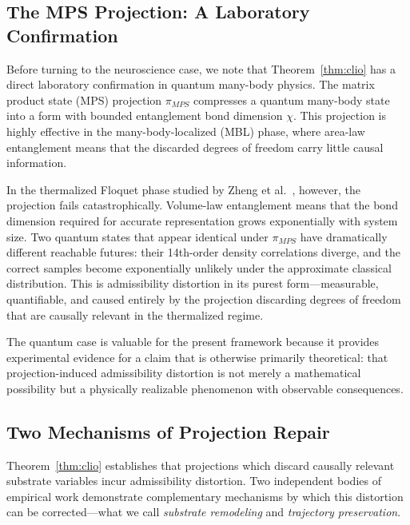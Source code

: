 \documentclass[12pt,a4paper]{article}
\begin{document}
\subsection{The MPS Projection: A Laboratory Confirmation}

Before turning to the neuroscience case, we note that Theorem~\ref{thm:clio} has a direct laboratory confirmation in quantum many-body physics. The matrix product state (MPS) projection $\pi_{MPS}$ compresses a quantum many-body state into a form with bounded entanglement bond dimension $\chi$. This projection is highly effective in the many-body-localized (MBL) phase, where area-law entanglement means that the discarded degrees of freedom carry little causal information.

In the thermalized Floquet phase studied by Zheng et al.~\cite{zheng2026}, however, the projection fails catastrophically. Volume-law entanglement means that the bond dimension required for accurate representation grows exponentially with system size. Two quantum states that appear identical under $\pi_{MPS}$ have dramatically different reachable futures: their 14th-order density correlations diverge, and the correct samples become exponentially unlikely under the approximate classical distribution. This is admissibility distortion in its purest form---measurable, quantifiable, and caused entirely by the projection discarding degrees of freedom that are causally relevant in the thermalized regime.

The quantum case is valuable for the present framework because it provides experimental evidence for a claim that is otherwise primarily theoretical: that projection-induced admissibility distortion is not merely a mathematical possibility but a physically realizable phenomenon with observable consequences.

\subsection{Two Mechanisms of Projection Repair}

Theorem~\ref{thm:clio} establishes that projections which discard causally relevant substrate variables incur admissibility distortion. Two independent bodies of empirical work demonstrate complementary mechanisms by which this distortion can be corrected---what we call \emph{substrate remodeling} and \emph{trajectory preservation}.
\end{document}
